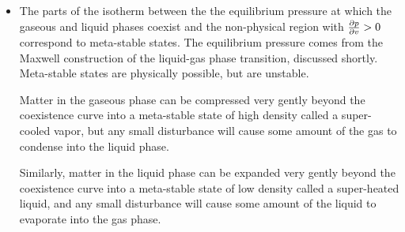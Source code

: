 \documentclass[11pt, a4paper]{article}
\begin{document}
\begin{itemize}
	\item The parts of the isotherm between the the equilibrium pressure at which the gaseous and liquid phases coexist and the non-physical region with $ \pdv{p}{v} > 0 $ correspond to meta-stable states. The equilibrium pressure comes from the Maxwell construction of the liquid-gas phase transition, discussed shortly. Meta-stable states are physically possible, but are unstable.
	
	Matter in the gaseous phase can be compressed very gently beyond the coexistence curve into a meta-stable state of high density called a super-cooled vapor, but any small disturbance will cause some amount of the gas to condense into the liquid phase. 
	
	Similarly, matter in the liquid phase can be expanded very gently beyond the coexistence curve into a meta-stable state of low density called a super-heated liquid, and any small disturbance will cause some amount of the liquid to evaporate into the gas phase. 

\end{itemize}

\iffalse %
\subsubsection{Phase Diagrams for Fluids}
\textit{Discuss the a typical phase diagram of a fluid. What is the triple point and what is the critical point? How is the phase diagram for water unique for fluids?}

\begin{itemize}
	\item Here's a typical fluid phase diagram. At low pressure and high temperature the substance is in a gaseous phase. At low temperatures and high pressures the substance is in a solid phase. At intermediate pressures and temperatures, the substance is in a liquid phase.
	
	Phase diagrams have lines separating regions of different phases. The phase changes upon crossing these lines. 
	
	\item A critical point is a point beyond which we can no longer distinguish between a liquid and gaseous state. In this region, density changes continuously with temperature and pressure. The existence of the critical point is possible because the fluid and liquid state are roughly equally symmetric.
	
	At a triple point is a point on the phase diagram where all three phases coexist in equilibrium. 
	
\end{itemize}
\fi
\end{document}
